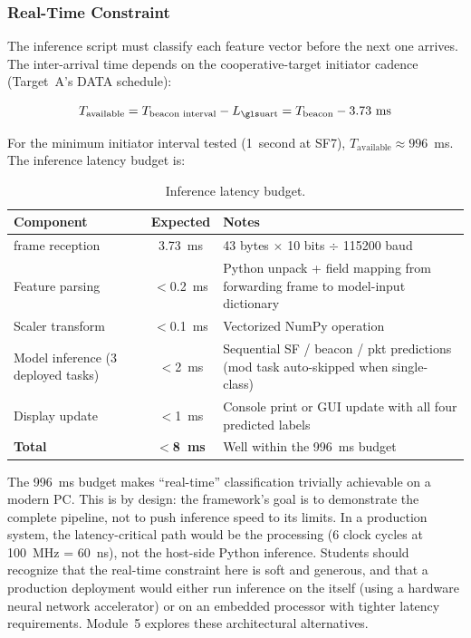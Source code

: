 \documentclass[11pt,letterpaper]{article}
\begin{document}
	\subsubsection{Real-Time Constraint}

	The inference script must classify each feature vector before the next one arrives. The inter-arrival time depends on the cooperative-target initiator cadence (Target~A's DATA schedule):

	\begin{equation}
		T_{\text{available}} = T_{\text{beacon interval}} - L_{\text{\UART{}}} = T_{\text{beacon}} - 3.73\text{~ms}
		\label{eq:realtime}
	\end{equation}

	For the minimum initiator interval tested (1~second at SF7), $T_{\text{available}} \approx 996$~ms. The inference latency budget is:

	\begin{table}[ht!]
		\centering
		\caption{Inference latency budget.}
		\label{tab:inference_latency}
		\renewcommand{\arraystretch}{1.3}
		\begin{tabularx}{\textwidth}{l c X}
			\toprule
			\textbf{Component} & \textbf{Expected} & \textbf{Notes} \\
			\midrule
			\UART{} frame reception & 3.73~ms & 43 bytes $\times$ 10 bits $\div$ 115200 baud \\
			Feature parsing & $<$0.2~ms & Python unpack + field mapping from forwarding frame to model-input dictionary \\
			Scaler transform & $<$0.1~ms & Vectorized NumPy operation \\
			Model inference (3 deployed tasks) & $<$2~ms & Sequential SF / beacon / pkt predictions (mod task auto-skipped when single-class) \\
			Display update & $<$1~ms & Console print or GUI update with all four predicted labels \\
			\midrule
			\textbf{Total} & $<$\textbf{8~ms} & Well within the 996~ms budget \\
			\bottomrule
		\end{tabularx}
	\end{table}

	\begin{tcolorbox}[infobox={Design Principle: Real-Time is Relative}]
		The 996~ms budget makes ``real-time'' classification trivially achievable on a modern PC. This is by design: the framework's goal is to demonstrate the complete pipeline, not to push inference speed to its limits. In a production system, the latency-critical path would be the \FPGA{} processing (6 clock cycles at 100~MHz = 60~ns), not the host-side Python inference. Students should recognize that the real-time constraint here is soft and generous, and that a production deployment would either run inference on the \FPGA{} itself (using a hardware neural network accelerator) or on an embedded processor with tighter latency requirements. Module~5 explores these architectural alternatives.
	\end{tcolorbox}
\end{document}

